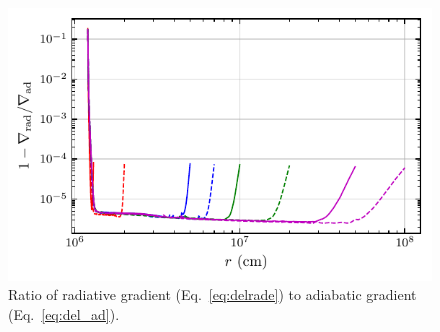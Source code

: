 \documentclass[../main.tex]{subfiles}
\begin{document}
\begin{figure}[htb!]
    \centering
    \includegraphics{figures/env_del.pdf}
    \caption[Envelope radiative to adiabatic gradient ratios]{Ratio of radiative gradient (Eq.~\ref{eq:delrade}) to adiabatic gradient (Eq.~\ref{eq:del_ad}).}
    \label{fig:env_del}
\end{figure}
\end{document}
